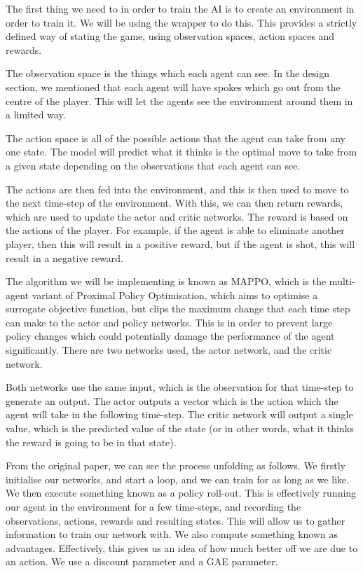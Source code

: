 \vs
The first thing we need to in order to train the AI is to create an environment in order to train it. We will be using the  wrapper to do this. This provides a strictly defined way of stating the game, using observation spaces, action spaces and rewards.

\vs
The observation space is the things which each agent can see. In the design section, we mentioned that each agent will have spokes which go out from the centre of the player. This will let the agents see the environment around them in a limited way.

\vs
The action space is all of the possible actions that the agent can take from any one state. The model will predict what it thinks is the optimal move to take from a given state depending on the observations that each agent can see.

\vs
The actions are then fed into the environment, and this is then used to move to the next time-step of the environment. With this, we can then return rewards, which are used to update the actor and critic networks. The reward is based on the actions of the player. For example, if the agent is able to eliminate another player, then this will result in a positive reward, but if the agent is shot, this will result in a negative reward.

\vs
The algorithm we will be implementing is known as MAPPO, which is the multi-agent variant of Proximal Policy Optimisation, which aims to optimise a surrogate objective function, but clips the maximum change that each time step can make to the actor and policy networks. This is in order to prevent large policy changes which could potentially damage the performance of the agent significantly. There are two networks used, the actor network, and the critic network.

\vs
Both networks use the same input, which is the observation for that time-step to generate an output. The actor outputs a vector which is the action which the agent will take in the following time-step. The critic network will output a single value, which is the predicted value of the state (or in other words, what it thinks the reward is going to be in that state).

\vs
From the original paper, we can see the process unfolding as follows. We firstly initialise our networks, and start a loop, and we can train for as long as we like. We then execute something known as a policy roll-out. This is effectively running our agent in the environment for a few time-steps, and recording the observations, actions, rewards and resulting states. This will allow us to gather information to train our network with. We also compute something known as advantages. Effectively, this gives us an idea of how much better off we are due to an action. We use a discount parameter and a GAE parameter.

